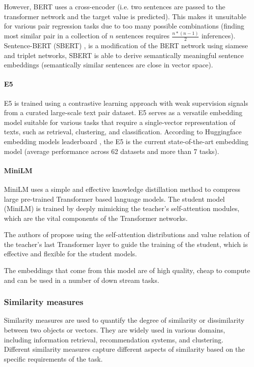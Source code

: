 \documentclass[a4paper,12pt]{article}
\begin{document}
However, BERT \cite{bert} uses a cross-encoder (i.e. two sentences are passed to the transformer network and the target value is predicted). This makes it unsuitable for various pair regression tasks due to too many possible combinations (finding most similar pair in a collection of $n$ sentences requires $\frac{n*(n-1)}{2}$ inferences). Sentence-BERT (SBERT) \cite{sbert}, is a modification of the BERT network using siamese and triplet networks, SBERT is able to
derive semantically meaningful sentence embeddings (semantically similar sentences are close in vector space).

\paragraph{E5}
E5 \cite{e5} is trained using a contrastive learning approach with weak supervision signals from a curated large-scale text pair dataset. 
E5 serves as a versatile embedding model suitable for various tasks that require a single-vector representation of texts, such as retrieval, clustering, and classification. 
According to Huggingface embedding models leaderboard \cite{embedding-leaderboard}, the E5 \cite{e5} is the current state-of-the-art embedding model (average performance across 62 datasets and more than 7 tasks).

\paragraph{MiniLM}
MiniLM \cite{minilm} uses a simple and effective knowledge distillation method to compress large pre-trained Transformer based language models. The student model (MiniLM) is trained by deeply mimicking the teacher’s self-attention \cite{attention} modules,
which are the vital components of the Transformer networks.

The authors of \cite{minilm} propose using the self-attention distributions and value
relation of the teacher’s last Transformer layer to guide the
training of the student, which is effective and flexible for the student models. 

The embeddings that come from this model are of high quality, cheap to compute and can be used in a number of down stream tasks.


\subsubsection{Similarity measures}
Similarity measures are used to quantify the degree of similarity or dissimilarity between two objects or vectors. They are widely used in various domains, including information retrieval, recommendation systems, and clustering. Different similarity measures capture different aspects of similarity based on the specific requirements of the task.
\end{document}
